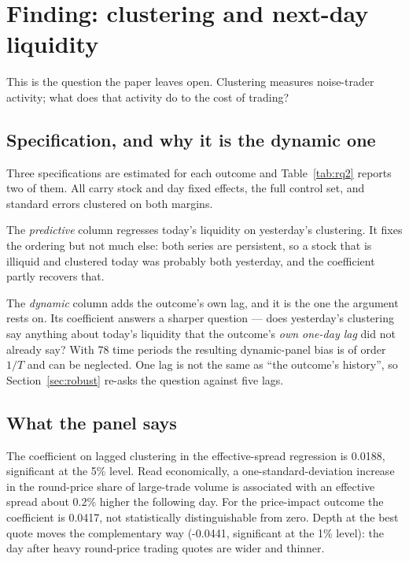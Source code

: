 
\section{Finding: clustering and next-day liquidity}
\label{sec:liquidity}

This is the question the paper leaves open. Clustering measures noise-trader
activity; what does that activity do to the cost of trading?

\subsection{Specification, and why it is the dynamic one}



Three specifications are estimated for each outcome and
Table~\ref{tab:rq2} reports two of them. All carry stock and day fixed
effects, the full control set, and standard errors clustered on both margins.

The \emph{predictive} column regresses today's liquidity on yesterday's
clustering. It fixes the ordering but not much else: both series are persistent,
so a stock that is illiquid and clustered today was probably both yesterday, and
the coefficient partly recovers that.

The \emph{dynamic} column adds the outcome's own lag, and it is the one the
argument rests on. Its coefficient answers a sharper question --- does
yesterday's clustering say anything about today's liquidity that the
outcome's \emph{own one-day lag} did not already say? With 78 time
periods the resulting dynamic-panel bias is of order $1/T$
\parencite{Nickell1981} and can be neglected. One lag is not the same as
``the outcome's history'', so Section~\ref{sec:robust} re-asks the question
against five lags.

\subsection{What the panel says}

The coefficient on lagged clustering in the effective-spread regression is
0.0188, significant at the 5\% level. Read economically, a one-standard-deviation
increase in the round-price share of large-trade volume is associated with an
effective spread about 0.2\% higher the following day. For the price-impact outcome the
coefficient is
0.0417, not statistically distinguishable from zero. Depth at the best quote moves the
complementary way (-0.0441, significant at the 1\% level): the day after heavy
round-price trading quotes are wider and thinner.

